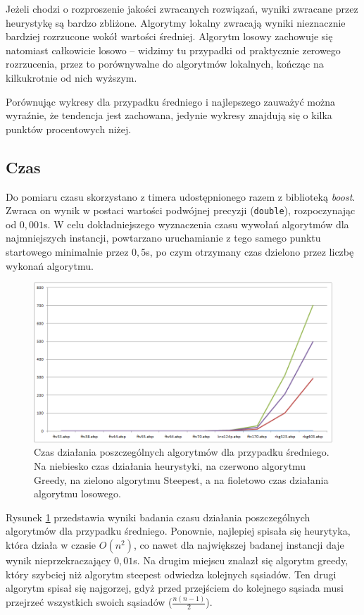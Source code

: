 Jeżeli chodzi o rozproszenie jakości zwracanych rozwiązań, wyniki zwracane przez heurystykę są bardzo zbliżone. Algorytmy lokalny zwracają wyniki nieznacznie bardziej rozrzucone wokół wartości średniej. Algorytm losowy zachowuje się natomiast całkowicie losowo -- widzimy tu przypadki od praktycznie zerowego rozrzucenia, przez to porównywalne do algorytmów lokalnych, kończąc na kilkukrotnie od nich wyższym.

Porównując wykresy dla przypadku średniego i najlepszego zauważyć można wyraźnie, że tendencja jest zachowana, jedynie wykresy znajdują się o kilka punktów procentowych niżej.

\subsection{Czas}
Do pomiaru czasu skorzystano z timera udostępnionego razem z biblioteką \emph{boost}. Zwraca on wynik w postaci wartości podwójnej precyzji (\texttt{double}), rozpoczynając od $0,001$s. W celu dokładniejszego wyznaczenia czasu wywołań algorytmów dla najmniejszych instancji, powtarzano uruchamianie z tego samego punktu startowego minimalnie przez $0,5$s, po czym otrzymany czas dzielono przez liczbę wykonań algorytmu.

\begin{figure}[!h]
\centering\includegraphics[width=12cm]{img/czas_avg}
\caption{Czas działania poszczególnych algorytmów dla przypadku średniego. Na niebiesko czas działania heurystyki, na czerwono algorytmu Greedy, na zielono algorytmu Steepest, a na fioletowo czas działania algorytmu losowego.}\label{rys:czas_avg}
\end{figure}

Rysunek \ref{rys:czas_avg} przedstawia wyniki badania czasu działania poszczególnych algorytmów dla przypadku średniego. Ponownie, najlepiej spisała się heurytyka, która działa w czasie $O(n^2)$, co nawet dla największej badanej instancji daje wynik nieprzekraczający $0,01$s. Na drugim miejscu znalazł się algorytm greedy, który szybciej niż algorytm steepest odwiedza kolejnych sąsiadów. Ten drugi algorytm spisał się najgorzej, gdyż przed przejściem do kolejnego sąsiada musi przejrzeć wszystkich swoich sąsiadów ($\frac{n(n-1)}{2}$).

